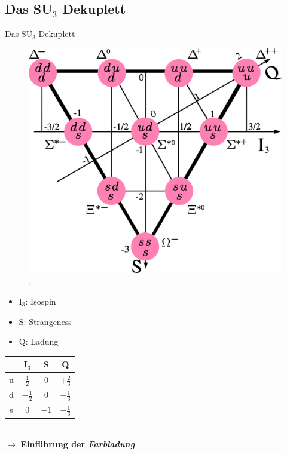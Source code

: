 \documentclass[aspectratio=169]{beamer} %
\begin{document}
    \subsection{Das SU$_3$ Dekuplett}
    \begin{frame}{Das SU\(_3\) Dekuplett}
        \begin{minipage}{0.6\textwidth}
          \begin{figure}
            \centering
          \includegraphics[width=\linewidth, keepaspectratio, height=0.8\textheight]{Baryon-decuplet-big.png}
          \tiny \\, 
      \end{figure}
        \end{minipage}
        \hfill
        \begin{minipage}{0.38\textwidth}
          \begin{itemize}
            \item I$_3$: Isospin
            \item S: Strangeness
            \item Q: Ladung %
          \end{itemize}
          \vspace{1em}

          \begin{tabular}{c|ccc}
            & I$_3$ & S & Q\\
            \hline
            u & $\frac{1}{2}$ & $0$ & $+\frac{2}{3}$\\
            d & $-\frac{1}{2}$ & $0$ & $-\frac{1}{3}$\\
            s & $0$ & $-1$ & $-\frac{1}{3}$        
          \end{tabular}\\[1em]
          $\rightarrow$\textbf{{ Einführung der \emph{Farbladung}}}
        \end{minipage}
    \end{frame}
    
\end{document}

